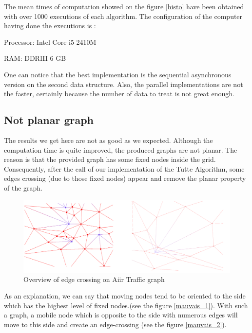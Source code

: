 The mean times of computation showed on the figure \ref{histo} have been
obtained with over 1000 executions of each algorithm. The configuration of the
computer having done the executions is :
\begin{description}
\item {Processor}: Intel Core i5-2410M
\item {RAM}: DDRIII 6 GB
\end{description}

One can notice that the best implementation is the sequential asynchronous
version on the second data structure. Also, the parallel implementations
are not the faster, certainly because the number of data to treat is not
great enough.

\subsection{Not planar graph}
The results we get here are not as good as we expected. Although the
computation time is quite improved, the produced graphs are not planar. The
reason is that the provided graph has some fixed nodes inside the
grid. Consequently, after the call of our implementation of the Tutte
Algorithm, some edges crossing (due to those fixed nodes) appear and remove
the planar property of the graph.
\begin{figure}
\includegraphics[width=\textwidth]{img/bad_case.png}
\caption{Overview of edge crossing on Aiir Traffic graph}
\end{figure}
As an explanation, we can say that moving nodes tend to be oriented to the 
side which has the highest level of fixed nodes.(see the figure \ref{mauvais_1}). 
With such a graph, a mobile node which is opposite to the side with numerous
edges will move to this side and create an edge-crossing (see the figure \ref{mauvais_2}).

